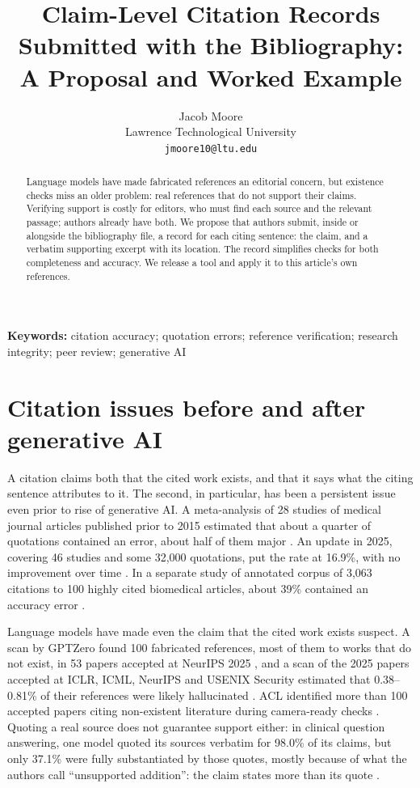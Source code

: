 \documentclass[11pt]{article}
\title{Claim-Level Citation Records Submitted with the Bibliography:\\A Proposal and Worked Example}
\author{Jacob Moore\\Lawrence Technological University\\\texttt{jmoore10@ltu.edu}}
\date{}
\begin{document}
\maketitle

\begin{abstract}
Language models have made fabricated references an editorial concern, but existence checks miss an older problem: real references that do not support their claims. Verifying support is costly for editors, who must find each source and the relevant passage; authors already have both. We propose that authors submit, inside or alongside the bibliography file, a record for each citing sentence: the claim, and a verbatim supporting excerpt with its location. The record simplifies checks for both completeness and accuracy. We release a tool and apply it to this article's own references.
\end{abstract}

\noindent\textbf{Keywords:} citation accuracy; quotation errors; reference verification; research integrity; peer review; generative AI

\section{Citation issues before and after generative AI}

A citation claims both that the cited work exists, and that it says what the citing sentence attributes to it. The second, in particular, has been a persistent issue even prior to rise of generative AI. A meta-analysis of 28 studies of medical journal articles published prior to 2015 estimated that about a quarter of quotations contained an error, about half of them major \citep{jergas2015quotation}. An update in 2025, covering 46 studies and some 32,000 quotations, put the rate at 16.9\%, with no improvement over time \citep{baethge2025quotation}. In a separate study of annotated corpus of 3,063 citations to 100 highly cited biomedical articles, about 39\% contained an accuracy error \citep{sarol2024citationintegrity}.

Language models have made even the claim that the cited work exists suspect. A scan by GPTZero found 100 fabricated references, most of them to works that do not exist, in 53 papers accepted at NeurIPS 2025 \citep{ansari2026compound}, and a scan of the 2025 papers accepted at ICLR, ICML, NeurIPS and USENIX Security estimated that 0.38--0.81\% of their references were likely hallucinated \citep{russinovich2026phantom}. ACL identified more than 100 accepted papers citing non-existent literature during camera-ready checks \citep{acl2026statement}. Quoting a real source does not guarantee support either: in clinical question answering, one model quoted its sources verbatim for 98.0\% of its claims, but only 37.1\% were fully substantiated by those quotes, mostly because of what the authors call ``unsupported addition'': the claim states more than its quote \citep{zhang2026verifiable}.
\end{document}
